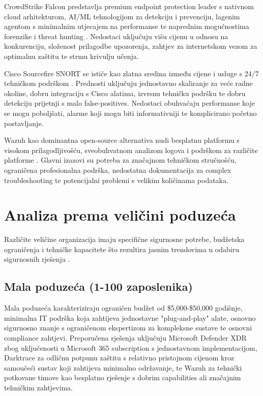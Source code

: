 \documentclass[utf8, seminar]{fer}
\begin{document}
CrowdStrike Falcon predstavlja premium endpoint protection leader s nativnom cloud arhitekturom, AI/ML tehnologijom za detekciju i prevenciju, lagenim agentom s minimalnim utjecajem na performanse te naprednim mogućnostima forenzike i threat hunting \cite{g2_crowdstrike_comparison}. Nedostaci uključuju višu cijenu u odnosu na konkurenciju, složenost prilagodbe upozorenja, zahtjev za internetskom vezom za optimalnu zaštitu te strmu krivulju učenja.

Cisco Sourcefire SNORT se ističe kao zlatna sredina između cijene i usluge s 24/7 tehničkom podrškom \cite{peerspot_snort_pros, peerspot_snort_paloalto}. Prednosti uključuju jednostavno skaliranje za veće radne okoline, dobru integraciju s Cisco alatima, izvrsnu tehničku podršku te dobru detekciju prijetnji s malo false-positives. Nedostaci obuhvaćaju performanse koje se mogu poboljšati, alarme koji mogu biti informativniji te komplicirano početno postavljanje.

Wazuh kao dominantna open-source alternativa nudi besplatnu platformu s visokom prilagodljivošću, sveobuhvatnom analizom logova i podrškom za različite platforme \cite{g2_crowdstrike_comparison, g2_cortex_comparison}. Glavni izazovi su potreba za značajnom tehničkom stručnošću, ograničena profesionalna podrška, nedostatna dokumentacija za complex troubleshooting te potencijalni problemi s velikim količinama podataka.

\chapter{Analiza prema veličini poduzeća}

Različite veličine organizacija imaju specifične sigurnosne potrebe, budžetska ograničenja i tehničke kapacitete što rezultira jasnim trendovima u odabiru sigurnosnih rješenja \cite{peerspot_snort_darktrace}.

\section{Mala poduzeća (1-100 zaposlenika)}

Mala poduzeća karakteriziraju ograničen budžet od \$5,000-\$50,000 godišnje, minimalna IT podrška koja zahtijeva jednostavne "plug-and-play" alate, osnovno sigurnosno znanje s ograničenom ekspertizom za kompleksne sustave te osnovni compliance zahtjevi. Preporučena rješenja uključuju Microsoft Defender XDR zbog uključenosti u Microsoft 365 subscription s jednostavnom implementacijom, Darktrace za odličnu potpunu zaštitu s relativno pristojnom cijenom kroz samoučeći sustav koji zahtijeva minimalno održavanje, te Wazuh za tehnički potkovane timove kao besplatno rješenje s dobrim capabilities ali značajnim tehničkim zahtjevima.
\end{document}
